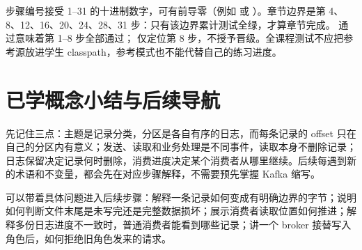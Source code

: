 步骤编号接受 1–31 的十进制数字，可有前导零（例如  或 ）。章节边界是第 4、8、12、16、20、24、28、31 步：只有该边界累计测试全绿，才算章节完成。 通过意味着第 1–8 步全部通过； 仅定位第 8 步，不授予晋级。全课程测试不应把参考源放进学生 classpath，参考模式也不能代替自己的练习进度。

\section{已学概念小结与后续导航}
先记住三点：主题是记录分类，分区是各自有序的日志，而每条记录的 offset 只在自己的分区内有意义；发送、读取和业务处理是不同事件，读取本身不删除记录；日志保留决定记录何时删除，消费进度决定某个消费者从哪里继续。后续每遇到新的术语和不变量，都会先在对应步骤解释，不需要预先掌握 Kafka 缩写。

可以带着具体问题进入后续步骤：解释一条记录如何变成有明确边界的字节；说明如何判断文件末尾是未写完还是完整数据损坏；展示消费者读取位置如何推进；解释多份日志进度不一致时，普通消费者能看到哪些记录；讲一个 broker 接替写入角色后，如何拒绝旧角色发来的请求。
